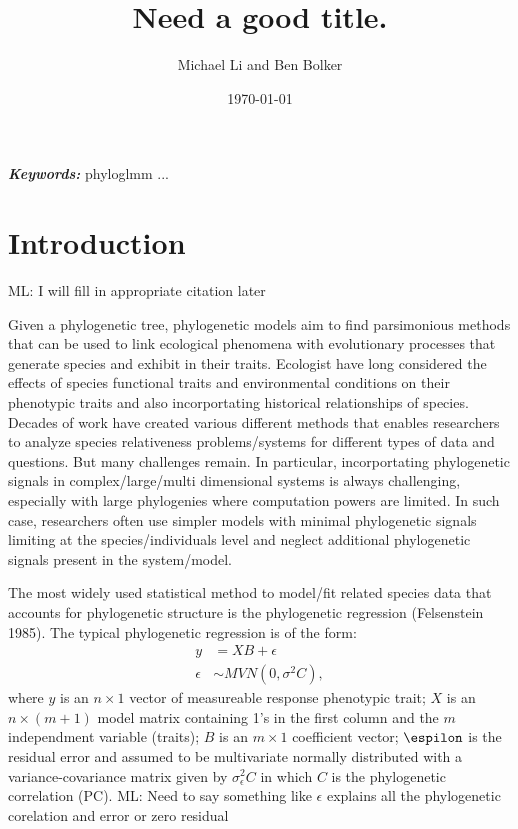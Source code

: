 \documentclass[12pt]{article}
\title{Need a good title.}
\author{Michael Li and Ben Bolker}
\date{\today}
\providecommand{\keywords}[1]{\textbf{\textit{Keywords:}} #1}
\begin{document}
\newcommand{\dbic}{\ensuremath \Delta \textrm{BIC}}

\newcommand{\bmbhide}[1]{}
\newcommand{\bmb}[1]{{\color{blue} BB: #1}}

\newcommand{\fref}[1]{Figure~\ref{fig:#1}}

\newcommand{\ml}[1]{{\color{red} ML: #1}}

\newcommand{\add}[1]{{\color{blue} ADD: #1}}

\maketitle

\doublespacing

\keywords{phyloglmm ... }

\section{Introduction}
\ml{I will fill in appropriate citation later}


Given a phylogenetic tree, phylogenetic models aim to find parsimonious methods that can be used to link ecological phenomena with evolutionary processes that generate species and exhibit in their traits.
Ecologist have long considered the effects of species functional traits and environmental conditions on their phenotypic traits and also incorportating historical relationships of species.
Decades of work have created various different methods that enables researchers to analyze species relativeness problems/systems for different types of data and questions.
But many challenges remain.
In particular, incorportating phylogenetic signals in complex/large/multi dimensional systems is always challenging, especially with large phylogenies where computation powers are limited.
In such case, researchers often use simpler models with minimal phylogenetic signals limiting at the species/individuals level and neglect additional phylogenetic signals present in the system/model.

The most widely used statistical method to model/fit related species data that accounts for phylogenetic structure is the phylogenetic regression (Felsenstein 1985).
The typical phylogenetic regression is of the form:
\begin{align}
y & = XB + \epsilon \\
\epsilon & \sim MVN(0,\sigma^{2}C),
\end{align}
where $y$ is an $n \times 1$ vector of measureable response phenotypic trait; $X$ is an $n \times (m + 1)$ model matrix containing 1's in the first column and the $m$ independment variable (traits); $B$ is an $m \times 1$ coefficient vector; $\espilon$ is the residual error and assumed to be multivariate normally distributed with a variance-covariance matrix given by $\sigma^{2}_{ \epsilon} C$ in which $C$ is the phylogenetic correlation (PC).
\ml{Need to say something like $\epsilon$ explains all the phylogenetic corelation and error or zero residual}
\end{document}
